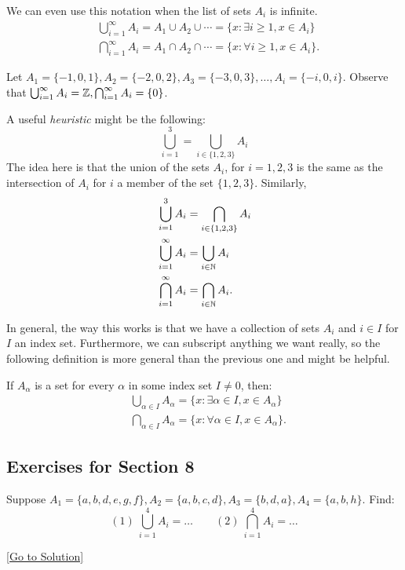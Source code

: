 We can even use this notation when the list of sets $A_i$ is infinite. 
$$
\begin{aligned}
    &\bigcup^{\infty}_{i=1}A_i=A_1\cup A_2\cup\cdots = \{ x:\exists i\ge 1,x\in A_i \}\\
    &\bigcap^{\infty}_{i=1}A_i=A_1\cap A_2 \cap\cdots = \{ x:\forall i\ge1,x\in A_i \}.
\end{aligned}
$$

\begin{example}
    Let $A_1=\{ -1,0,1 \},A_2=\{ -2,0,2 \},A_3=\{ -3,0,3 \},\dots,A_i=\{ -i,0,i \}.$ Observe that $\bigcup^{\infty}_{i=1}A_i=\mathbb{Z}, \bigcap^{\infty}_{i=1}A_i=\{ 0 \}$.
\end{example}

A useful \emph{heuristic} might be the following: 
$$
\bigcup^{3}_{i=1}=\bigcup_{i\in\{ 1,2,3 \}}A_i
$$
The idea here is that the union of the sets $A_i$, for $i=1,2,3$ is the same as the intersection of $A_i$ for $i$ a member of the set $\{ 1,2,3 \}$. Similarly, 
$$
\begin{aligned}
    &\bigcup^{3}_{i=1}A_i=\bigcap_{i\in \{ 1,2,3 \}}A_i\\
    &\bigcup^{\infty}_{i=1}A_i=\bigcup_{i\in\mathbb{N}}A_i\\
    &\bigcap^{\infty}_{i=1}A_i=\bigcap_{i\in\mathbb{N}}A_i.
\end{aligned}
$$

In general, the way this works is that we have a collection of sets $A_i$ and $i\in I$ for $I$ an index set. Furthermore, we can subscript anything we want really, so the following definition is more general than the previous one and might be helpful. 
\begin{defn}
    If $A_{\alpha}$ is a set for every $\alpha$ in some index set $I\ne 0$, then: 
    $$
    \begin{aligned}
        &\bigcup_{\alpha\in I}A_{\alpha}=\{ x:\exists \alpha\in I,x\in A_{\alpha} \}\\
        &\bigcap_{\alpha \in I}A_{\alpha}=\{ x:\forall \alpha \in I, x\in A_{\alpha} \}.
    \end{aligned}
    $$
\end{defn}
\subsection{Exercises for Section 8}

\begin{exercise}\label{ex:8.1}
    Suppose $A_{1} = \{ a,b,d,e,g,f \}, A_{2}=\{ a,b,c,d \}, A_{3}=\{ b,d,a \},A_{4} = \{ a,b,h \}$. Find:
    $$
       (1)~ \bigcup^{4}_{i=1}A_{i}=\dots\quad\quad 
        (2)~ \bigcap^{4}_{i=1}A_{i}=\dots
    $$
\end{exercise}\hyperref[sol:8.1]{[Go to Solution]}

